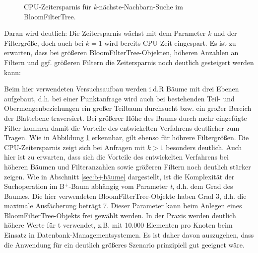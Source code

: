 \begin{figure}[hpbt]
 \caption[CPU-Zeitersparnis für \textit{k}-nächste-Nachbarn-Suche im BloomFilterTree.]{CPU-Zeitersparnis für \textit{k}-nächste-Nachbarn-Suche im BloomFilterTree.}
 \label{fig:multipic1} %
\end{figure}
Daran wird deutlich: Die Zeitersparnis wächst mit dem Parameter \textit{k} und der Filtergröße, doch auch bei $k=1$ wird bereits CPU-Zeit eingespart. Es ist zu erwarten, dass bei größeren BloomFilterTree-Objekten, höheren Anzahlen an Filtern und ggf. größeren Filtern die Zeitersparnis noch deutlich gesteigert werden kann: 

Beim hier verwendeten Versuchsaufbau werden i.d.R Bäume mit drei Ebenen aufgebaut, d.h. bei einer Punktanfrage wird auch bei bestehenden Teil- und Obermengenbeziehungen ein großer Teilbaum durchsucht bzw. ein großer Bereich der Blattebene traversiert. Bei größerer Höhe des Baums durch mehr eingefügte Filter kommen damit die Vorteile des entwickelten Verfahrens deutlicher zum Tragen. Wie in Abbildung \ref{fig:multipic1} erkennbar, gilt ebenso für höhrere Filtergrößen. Die CPU-Zeitersparnis zeigt sich bei Anfragen mit $k>1$ besonders deutlich. Auch hier ist zu erwarten, dass sich die Vorteile des entwickelten Verfahrens bei höheren Bäumen und Filteranzahlen sowie größeren Filtern noch deutlich stärker zeigen.
\newpage
\noindent
Wie in Abschnitt \ref{sec:b+bäume} dargestellt, ist die Komplexität der Suchoperation im B$^+$-Baum abhängig vom Parameter \textit{t}, d.h. dem Grad des Baumes. Die hier verwendeten BloomFilterTree-Objekte haben Grad 3, d.h. die maximale Ausfächerung beträgt 7. Dieser Parameter kann beim Anlegen eines BloomFilterTree-Objekts frei gewählt werden. In der Praxis werden deutlich höhere Werte für t verwendet, z.B. mit 10.000 Elementen pro Knoten beim Einsatz in Datenbank-Managementsystemen. Es ist daher davon auszugehen, dass die Anwendung für ein deutlich größeres Szenario prinzipiell gut geeignet wäre.  

